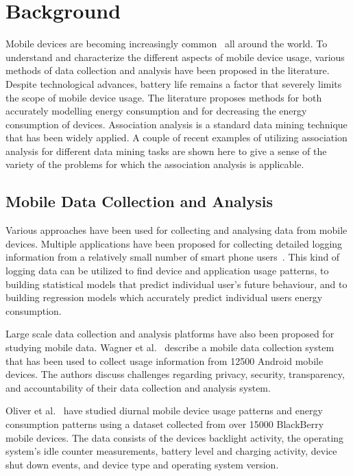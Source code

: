 \section{Background}

Mobile devices are becoming increasingly common~\cite{ITUstats} all around the world. To understand and characterize the different aspects of mobile device usage, various methods of data collection and analysis have been proposed in the literature. Despite technological advances, battery life remains a factor that severely limits the scope of mobile device usage. The literature proposes methods for both accurately modelling energy consumption and for decreasing the energy consumption of devices. Association analysis is a standard data mining technique that has been widely applied. A couple of recent examples of utilizing association analysis for different data mining tasks are shown here to give a sense of the variety of the problems for which the association analysis is applicable. 

\subsection{Mobile Data Collection and Analysis}

Various approaches have been used for collecting and analysing data from mobile devices. Multiple applications have been proposed for collecting detailed logging information from a relatively small number of smart phone users~\cite{Ferreira:2014:CES:2628363.2628367, Falaki:2010:DSU:1814433.1814453, 5375354}. This kind of logging data can be utilized to find device and application usage patterns, to building statistical models that predict individual user's future behaviour, and to building regression models which accurately predict individual users energy consumption. 

Large scale data collection and analysis platforms have also been proposed for studying mobile data. Wagner et al.~\cite{Wagner:2014:DAL:2627534.2627553} describe a mobile data collection system that has been used to collect usage information from 12500 Android mobile devices. The authors discuss challenges regarding privacy, security, transparency, and accountability of their data collection and analysis system. 

Oliver et al.~\cite{Oliver:2010:CLS:1834616.1834623, Oliver_datadriven} have studied diurnal mobile device usage patterns and energy consumption patterns using a dataset collected from over 15000 BlackBerry mobile devices. The data consists of the devices backlight activity, the operating system's idle counter measurements, battery level and charging activity, device shut down events, and device type and operating system version.      

